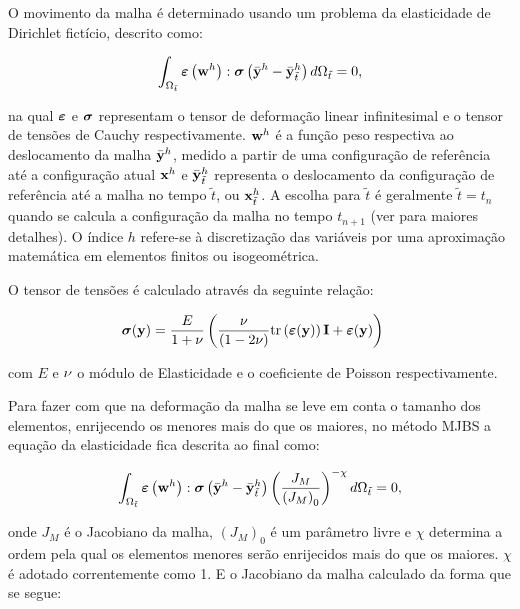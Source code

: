 \documentclass[tese_patricia]{subfiles}
\begin{document}
O movimento da malha é determinado usando um problema da elasticidade de Dirichlet fictício, descrito como:

\begin{align}
	\int_{\Omega_{\tilde{t}}} \bm{\varepsilon} \left(\mathbf{w}^h\right) : \boldsymbol{\sigma} \left(\bar{\mathbf{y}}^h - \bar{\mathbf{y}}^h_{\tilde{t}}\right) d\Omega_{\tilde{t}} = 0,
	\label{eq:elasticityequation}
\end{align}

\noindent na qual $\bm{\varepsilon}$ e $\boldsymbol{\sigma}$ representam o tensor de deformação linear infinitesimal e o tensor de tensões de Cauchy respectivamente. $\mathbf{w}^h$ é a função peso respectiva ao deslocamento da malha  $\bar{\mathbf{y}}^h$, medido a partir de uma configuração de referência até a configuração atual $\mathbf{x}^h$ e 
$\bar{\mathbf{y}}^h_{\tilde{t}}$ representa o deslocamento da configuração de referência até a malha no tempo ${\tilde{t}}$, ou $\mathbf{x}^h_{\tilde{t}}$. 
A escolha para ${\tilde{t}}$ é geralmente ${\tilde{t}} = {t_{n}}$ quando se calcula a configuração da malha no tempo ${t_{n+1}}$ (ver  para maiores detalhes). O índice $h$ refere-se à discretização das variáveis por uma aproximação matemática em elementos finitos ou isogeométrica.

O tensor de tensões é calculado através da seguinte relação:

\begin{align}
	\boldsymbol{\sigma}(\mathbf{y})
	&=
	\frac{E}{1+\nu}
	\left(
	\frac{\nu}{(1 - 2 \nu)}
	\mathrm{tr}\left(\bm{\varepsilon}(\mathbf{y})\right)\mathbf{I}
	+
	\bm{\varepsilon}(\mathbf{y})
	\right)
\end{align}

\noindent com $E$ e $\nu$ o módulo de Elasticidade e o coeficiente de Poisson respectivamente.

Para fazer com que na deformação da malha se leve em conta o tamanho dos elementos, enrijecendo os menores mais do que os maiores, no método MJBS a equação da elasticidade fica descrita ao final como:

\begin{align}
	\int_{\Omega_{\tilde{t}}} \bm{\varepsilon} \left(\mathbf{w}^h\right) : \boldsymbol{\sigma} \left(\bar{\mathbf{y}}^h- \bar{\mathbf{y}}^h_{\tilde{t}}\right) \left(\frac{J_M}{\left({J_M}\right)_0}\right)^{-\chi} d\Omega_{\tilde{t}} = 0, 
	\label{eq:MJBS}
\end{align}

\noindent onde $J_M$ é o Jacobiano da malha, $(J_M)_0$ é um parâmetro livre e $\chi$ determina a ordem pela qual os elementos menores serão enrijecidos mais do que os maiores.  $\chi$ é adotado correntemente como 1. E o Jacobiano da malha calculado da forma que se segue:
\end{document}
